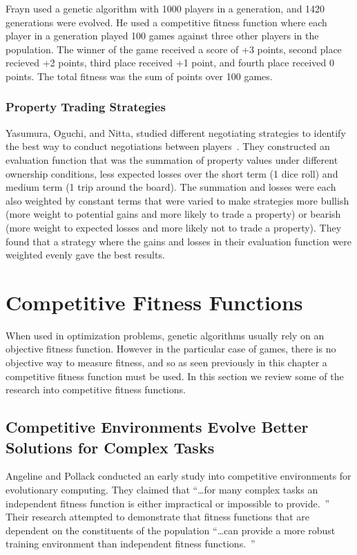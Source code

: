 Frayn used a genetic algorithm with 1000 players in a generation, and
1420 generations were evolved. He used a competitive fitness function where each
player in a generation played 100 games against three other players in the
population. The winner of the game received a score of +3 points, second place
recieved +2 points, third place received +1 point, and fourth place received 0
points. The total fitness was the sum of points over 100 games.

\subsubsection{Property Trading Strategies} \label{3_trading}

Yasumura, Oguchi, and Nitta, studied different negotiating strategies to
identify the best way to conduct negotiations between
players~\cite{Yasumura2001Negotiate}. They constructed an evaluation function
that was the summation of property values under different ownership conditions,
less expected losses over the short term (1 dice roll) and medium term (1 trip
around the board). The summation and losses were each also weighted by constant
terms that were varied to make strategies more bullish (more weight to potential
gains and more likely to trade a property) or bearish (more weight to expected
losses and more likely not to trade a property). They found that a strategy
where the gains and losses in their evaluation function were weighted evenly
gave the best results.

\section{Competitive Fitness Functions}

When used in optimization problems, genetic algorithms usually rely on an
objective fitness function. However in the particular case of games, there is no
objective way to measure fitness, and so as seen previously in this chapter a
competitive fitness function must be used. In this section we review some of the
research into competitive fitness functions.

\subsection{Competitive Environments Evolve Better Solutions for Complex Tasks}

Angeline and Pollack conducted an early study into competitive environments for
evolutionary computing. They claimed that ``\ldots for many complex tasks an
independent fitness function is either impractical or impossible to
provide.~\cite{Angeline:1993:CEE:645513.657590}'' Their research attempted to
demonstrate that fitness functions that are dependent on the constituents of the
population ``\ldots can provide a more robust training environment than
independent fitness functions.~\cite{Angeline:1993:CEE:645513.657590}''

